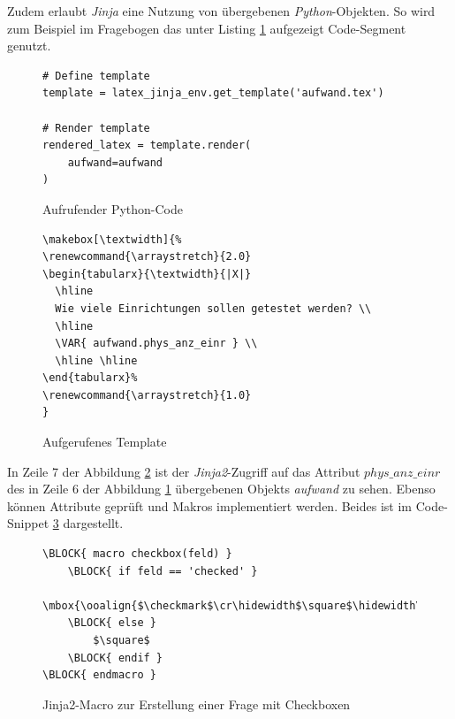 Zudem erlaubt \textit{Jinja} eine Nutzung von übergebenen \textit{Python}-Objekten. So wird zum Beispiel im Fragebogen das unter Listing \ref{ref:jinja2-py} aufgezeigt Code-Segment genutzt.\\

\lstset{language=Python}
\begin{figure}[htbp]
\begin{lstlisting}
# Define template
template = latex_jinja_env.get_template('aufwand.tex')

# Render template
rendered_latex = template.render(
    aufwand=aufwand
)
\end{lstlisting}
\caption{Aufrufender Python-Code}
\label{ref:jinja2-py}
\end{figure}

\begin{figure}[htbp]
\lstset{language=Tex}
\begin{lstlisting}
\makebox[\textwidth]{%
\renewcommand{\arraystretch}{2.0}
\begin{tabularx}{\textwidth}{|X|}
  \hline
  Wie viele Einrichtungen sollen getestet werden? \\
  \hline
  \VAR{ aufwand.phys_anz_einr }	\\
  \hline \hline
\end{tabularx}%
\renewcommand{\arraystretch}{1.0}
}
\end{lstlisting}
\caption{Aufgerufenes Template}
\label{ref:aufwand.tex}
\end{figure}

\newpage
In Zeile 7 der Abbildung \ref{ref:aufwand.tex} ist der \textit{Jinja2}-Zugriff auf das Attribut \textit{$phys\_anz\_einr$} des in Zeile 6 der Abbildung \ref{ref:jinja2-py} übergebenen Objekts \textit{aufwand} zu sehen. Ebenso können Attribute geprüft und Makros implementiert werden. Beides ist im Code-Snippet \ref{ref:PenProzAufJinjaMacroCheck} dargestellt.\\

\begin{figure}
\begin{lstlisting}
\BLOCK{ macro checkbox(feld) }
    \BLOCK{ if feld == 'checked' }
        \mbox{\ooalign{$\checkmark$\cr\hidewidth$\square$\hidewidth\cr}}
    \BLOCK{ else }
        $\square$
    \BLOCK{ endif }
\BLOCK{ endmacro }
\end{lstlisting}
\caption{Jinja2-Macro zur Erstellung einer Frage mit Checkboxen}
\label{ref:PenProzAufJinjaMacroCheck}
\end{figure}

